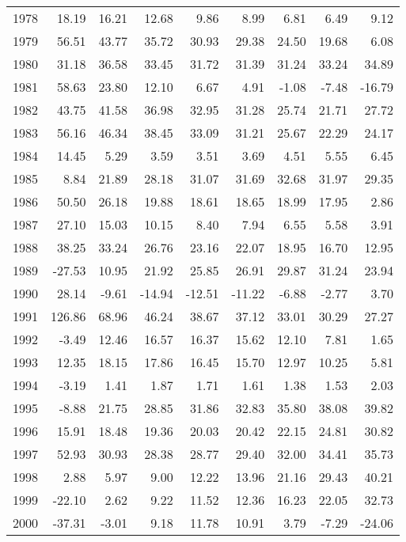 \begin{table}[ht]
\begin{tabular}{rrrrrrrrr}
  1978 & 18.19 & 16.21 & 12.68 & 9.86 & 8.99 & 6.81 & 6.49 & 9.12 \\ 
  1979 & 56.51 & 43.77 & 35.72 & 30.93 & 29.38 & 24.50 & 19.68 & 6.08 \\ 
  1980 & 31.18 & 36.58 & 33.45 & 31.72 & 31.39 & 31.24 & 33.24 & 34.89 \\ 
  1981 & 58.63 & 23.80 & 12.10 & 6.67 & 4.91 & -1.08 & -7.48 & -16.79 \\ 
  1982 & 43.75 & 41.58 & 36.98 & 32.95 & 31.28 & 25.74 & 21.71 & 27.72 \\ 
  1983 & 56.16 & 46.34 & 38.45 & 33.09 & 31.21 & 25.67 & 22.29 & 24.17 \\ 
  1984 & 14.45 & 5.29 & 3.59 & 3.51 & 3.69 & 4.51 & 5.55 & 6.45 \\ 
  1985 & 8.84 & 21.89 & 28.18 & 31.07 & 31.69 & 32.68 & 31.97 & 29.35 \\ 
  1986 & 50.50 & 26.18 & 19.88 & 18.61 & 18.65 & 18.99 & 17.95 & 2.86 \\ 
  1987 & 27.10 & 15.03 & 10.15 & 8.40 & 7.94 & 6.55 & 5.58 & 3.91 \\ 
  1988 & 38.25 & 33.24 & 26.76 & 23.16 & 22.07 & 18.95 & 16.70 & 12.95 \\ 
  1989 & -27.53 & 10.95 & 21.92 & 25.85 & 26.91 & 29.87 & 31.24 & 23.94 \\ 
  1990 & 28.14 & -9.61 & -14.94 & -12.51 & -11.22 & -6.88 & -2.77 & 3.70 \\ 
  1991 & 126.86 & 68.96 & 46.24 & 38.67 & 37.12 & 33.01 & 30.29 & 27.27 \\ 
  1992 & -3.49 & 12.46 & 16.57 & 16.37 & 15.62 & 12.10 & 7.81 & 1.65 \\ 
  1993 & 12.35 & 18.15 & 17.86 & 16.45 & 15.70 & 12.97 & 10.25 & 5.81 \\ 
  1994 & -3.19 & 1.41 & 1.87 & 1.71 & 1.61 & 1.38 & 1.53 & 2.03 \\ 
  1995 & -8.88 & 21.75 & 28.85 & 31.86 & 32.83 & 35.80 & 38.08 & 39.82 \\ 
  1996 & 15.91 & 18.48 & 19.36 & 20.03 & 20.42 & 22.15 & 24.81 & 30.82 \\ 
  1997 & 52.93 & 30.93 & 28.38 & 28.77 & 29.40 & 32.00 & 34.41 & 35.73 \\ 
  1998 & 2.88 & 5.97 & 9.00 & 12.22 & 13.96 & 21.16 & 29.43 & 40.21 \\ 
  1999 & -22.10 & 2.62 & 9.22 & 11.52 & 12.36 & 16.23 & 22.05 & 32.73 \\ 
  2000 & -37.31 & -3.01 & 9.18 & 11.78 & 10.91 & 3.79 & -7.29 & -24.06 \\ 

\end{tabular}
\end{table}
